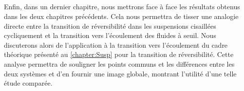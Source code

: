 \subparagraph{}Enfin, dans un dernier chapitre, nous mettrons face à face les résultats obtenus dans les deux chapitres précédents. Cela nous permettra de tisser une analogie directe entre la transition de réversibilité dans les suspensions cisaillées cycliquement et la transition vers l'écoulement des fluides à seuil. Nous discuterons alors de l'application à la transition vers l'écoulement du cadre théorique présenté au \autoref{chapter:Susp} pour la transition de réversibilité. Cette analyse permettra de souligner les points communs et les différences entre les deux systèmes et d'en fournir une image globale, montrant l'utilité d'une telle étude comparée.